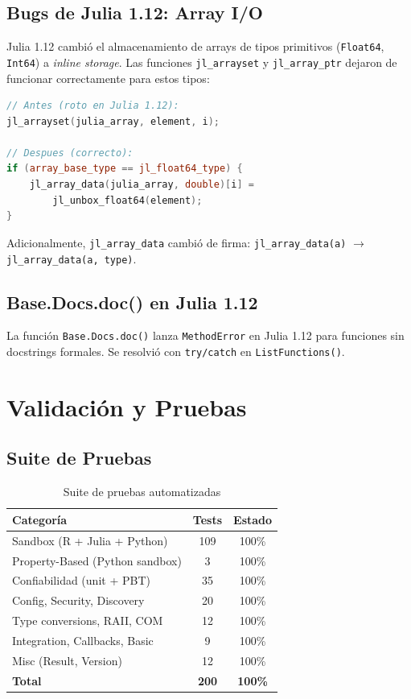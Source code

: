 \documentclass[12pt, a4paper]{report}
\begin{document}
\section{Bugs de Julia 1.12: Array I/O}

Julia 1.12 cambió el almacenamiento de arrays de tipos primitivos (\texttt{Float64}, \texttt{Int64}) a \textit{inline storage}. Las funciones \texttt{jl\_arrayset} y \texttt{jl\_array\_ptr} dejaron de funcionar correctamente para estos tipos:

\begin{lstlisting}[language=C++, caption={Fix para arrays primitivos en Julia 1.12}]
// Antes (roto en Julia 1.12):
jl_arrayset(julia_array, element, i);

// Despues (correcto):
if (array_base_type == jl_float64_type) {
    jl_array_data(julia_array, double)[i] = 
        jl_unbox_float64(element);
}
\end{lstlisting}

Adicionalmente, \texttt{jl\_array\_data} cambió de firma: \texttt{jl\_array\_data(a)} $\rightarrow$ \texttt{jl\_array\_data(a, type)}.

\section{Base.Docs.doc() en Julia 1.12}

La función \texttt{Base.Docs.doc()} lanza \texttt{MethodError} en Julia 1.12 para funciones sin docstrings formales. Se resolvió con \texttt{try/catch} en \texttt{ListFunctions()}.

\chapter{Validación y Pruebas}

\section{Suite de Pruebas}

\begin{table}[h]
\centering
\begin{tabular}{lcc}
\toprule
\textbf{Categoría} & \textbf{Tests} & \textbf{Estado} \\
\midrule
Sandbox (R + Julia + Python) & 109 & 100\% \\
Property-Based (Python sandbox) & 3 & 100\% \\
Confiabilidad (unit + PBT) & 35 & 100\% \\
Config, Security, Discovery & 20 & 100\% \\
Type conversions, RAII, COM & 12 & 100\% \\
Integration, Callbacks, Basic & 9 & 100\% \\
Misc (Result, Version) & 12 & 100\% \\
\midrule
\textbf{Total} & \textbf{200} & \textbf{100\%} \\
\bottomrule
\end{tabular}
\caption{Suite de pruebas automatizadas}
\end{table}
\end{document}
